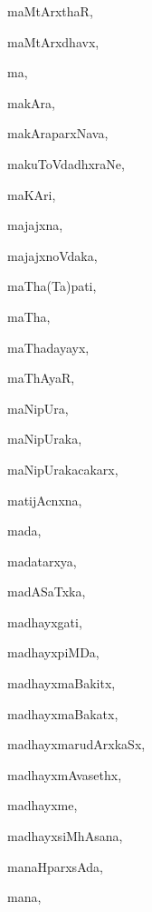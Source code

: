 \begin{multicols}{3}
{\noindent
{maMtArxthaR}, \pageref{maMtArxthaR}

\noindent
{maMtArxdhavx}, \pageref{maMtArxdhavx}

\noindent
{ma}, \pageref{ma}

\noindent
{makAra}, \pageref{makAra}

\noindent
{makAraparxNava}, \pageref{makAraparxNava}

\noindent
{makuToVdadhxraNe}, \pageref{makuToVdadhxraNe}

\noindent
{maKAri}, \pageref{maKAri}

\noindent
{majajxna}, \pageref{majajxna}

\noindent
{majajxnoVdaka}, \pageref{majajxnoVdaka}

\noindent
{maTha(Ta)pati}, \pageref{maThaTapati}

\noindent
{maTha}, \pageref{maTha}

\noindent
{maThadayayx}, \pageref{maThadayayx}

\noindent
{maThAyaR}, \pageref{maThAyaR}

\noindent
{maNipUra}, \pageref{maNipUra}

\noindent
{maNipUraka}, \pageref{maNipUraka}

\noindent
{maNipUrakacakarx}, \pageref{maNipUrakacakarx}

\noindent
{matijAcnxna}, \pageref{matijAcnxna}

\noindent
{mada}, \pageref{mada}

\noindent
{madatarxya}, \pageref{madatarxya}

\noindent
{madASaTxka}, \pageref{madASaTxka}

\noindent
{madhayxgati}, \pageref{madhayxgati}

\noindent
{madhayxpiMDa}, \pageref{madhayxpiMDa}

\noindent
{madhayxmaBakitx}, \pageref{madhayxmaBakitx}

\noindent
{madhayxmaBakatx}, \pageref{madhayxmaBakatx}

\noindent
{madhayxmarudArxkaSx}, \pageref{madhayxmarudArxkaSx}

\noindent
{madhayxmAvasethx}, \pageref{madhayxmAvasethx}

\noindent
{madhayxme}, \pageref{madhayxme}

\noindent
{madhayxsiMhAsana}, \pageref{madhayxsiMhAsana}

\noindent
{manaHparxsAda}, \pageref{manaHparxsAda}

\noindent
{mana}, \pageref{mana}

}
\end{multicols}
